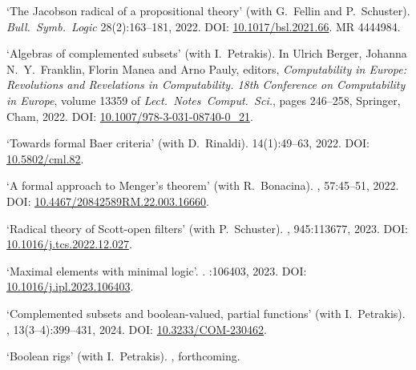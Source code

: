 \documentclass[a4paper]{article}
\begin{document}
\begin{flushleft}
\begin{thebibliography}{10}
\newblock `The {J}acobson radical of a propositional theory' (with G.~Fellin and P.~Schuster).
\newblock \emph{Bull.~Symb.~Logic} 28(2):163--181, 2022.
\newblock DOI: \href{https://doi.org/10.1017/bsl.2021.66}{10.1017/bsl.2021.66}.
\newblock MR 4444984.

\newblock `Algebras of complemented subsets' (with I.~Petrakis).
\newblock  In Ulrich Berger, Johanna N.~Y.~Franklin, Florin Manea and Arno Pauly, editors, {\em Computability in Europe: Revolutions and Revelations in Computability. 18th Conference on Computability in Europe},
\newblock volume 13359 of {\em Lect.~Notes~Comput.~Sci.}, pages 246--258, Springer, Cham, 2022.
\newblock DOI: \href{https://doi.org/10.1007/978-3-031-08740-0_21}{10.1007/978-3-031-08740-0\_21}.

\newblock `Towards formal Baer criteria' (with D.~Rinaldi).
 14(1):49--63, 2022.
\newblock DOI: \href{https://doi.org/10.5802/cml.82}{10.5802/cml.82}.

\newblock `A formal approach to Menger's theorem' (with R.~Bonacina).
, 57:45--51, 2022.
\newblock DOI: \href{https://doi.org/10.4467/20842589RM.22.003.16660}{10.4467/20842589RM.22.003.16660}.

\newblock `Radical theory of Scott-open filters' (with P.~Schuster).
, 945:113677, 2023.
\newblock DOI: \href{https://doi.org/10.1016/j.tcs.2022.12.027}{10.1016/j.tcs.2022.12.027}.

\newblock `Maximal elements with minimal logic'.
.
:106403, 2023.
\newblock DOI: \href{https://doi.org/10.1016/j.ipl.2023.106403}{10.1016/j.ipl.2023.106403}.

\newblock `Complemented subsets and boolean-valued, partial functions' (with I.~Petrakis).
, 13(3--4):399--431, 2024.
\newblock DOI: \href{}{10.3233/COM-230462}.

\newblock `Boolean rigs' (with I.~Petrakis).
, forthcoming.


\end{thebibliography}


\end{flushleft}
\end{document}
